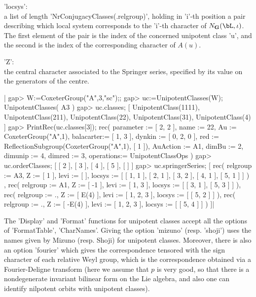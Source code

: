 'locsys':\\  a list  of length  'NrConjugacyClasses(.relgroup)', holding in
'i'-th  position a  pair describing  which local  system corresponds to the
'i'-th  character of $N_\bG(\bL,\iota)$.  The first element  of the pair is
the index of the concerned unipotent class 'u', and the second is the index
of the corresponding character of $A(u)$.

'Z':\\  the central character associated  to the Springer series, specified
by its value on the generators of the centre.

|    gap> W:=CoxeterGroup("A",3,"sc");;
    gap> uc:=UnipotentClasses(W);
    UnipotentClasses( A3 )
    gap> uc.classes;
    [ UnipotentClass(1111), UnipotentClass(211), UnipotentClass(22),
      UnipotentClass(31), UnipotentClass(4) ]
    gap> PrintRec(uc.classes[3]);
    rec(
      parameter := [ 2, 2 ],
      name      := 22,
      Au        := CoxeterGroup("A",1),
      balacarter:= [ 1, 3 ],
      dynkin    := [ 0, 2, 0 ],
      red       := ReflectionSubgroup(CoxeterGroup("A",1), [ 1 ]),
      AuAction  := A1,
      dimBu     := 2,
      dimunip   := 4,
      dimred    := 3,
      operations:= UnipotentClassOps )
    gap> uc.orderClasses;
    [ [ 2 ], [ 3 ], [ 4 ], [ 5 ], [  ] ]
    gap> uc.springerSeries;
    [ rec(
          relgroup := A3,
          Z := [ 1 ],
          levi := [  ],
          locsys := [ [ 1, 1 ], [ 2, 1 ], [ 3, 2 ], [ 4, 1 ], [ 5, 1 ] ] )
        , rec(
          relgroup := A1,
          Z := [ -1 ],
          levi := [ 1, 3 ],
          locsys := [ [ 3, 1 ], [ 5, 3 ] ] ), rec(
          relgroup := .,
          Z := [ E(4) ],
          levi := [ 1, 2, 3 ],
          locsys := [ [ 5, 2 ] ] ), rec(
          relgroup := .,
          Z := [ -E(4) ],
          levi := [ 1, 2, 3 ],
          locsys := [ [ 5, 4 ] ] ) ]|

The  'Display' and 'Format' functions for  unipotent classes accept all the
options  of 'FormatTable',  'CharNames'. Giving  the option 'mizuno' (resp.
'shoji')  uses  the  names  given  by  Mizuno  (resp.  Shoji) for unipotent
classes.  Moreover,  there  is  also  an  option  'fourier' which gives the
correspondence  tensored  with  the  sign  character  of each relative Weyl
group, which is the correspondence obtained via a Fourier-Deligne transform
(here  we assume that  $p$ is very  good, so that  there is a nondegenerate
invariant  bilinear  form  on  the  Lie  algebra, and also one can identify
nilpotent orbits with unipotent classes).

